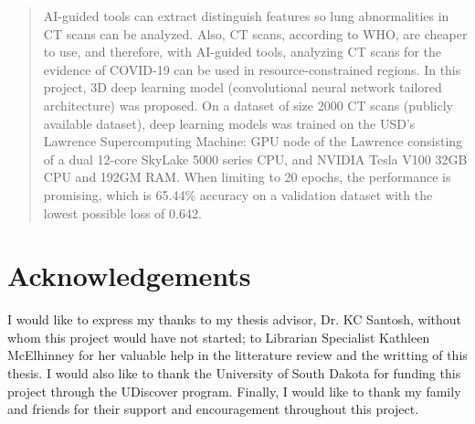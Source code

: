 \documentclass[12pt, letterpaper]{article}
\begin{document}
\newpage
\begin{abstract}
AI-guided tools can extract distinguish features so lung abnormalities in CT scans can be analyzed. Also, CT scans, according to WHO, are cheaper to use, and therefore, with AI-guided tools, analyzing CT scans for the evidence of COVID-19 can be used in resource-constrained regions. 
In this project, 3D deep learning model (convolutional neural network tailored architecture) was proposed. On a dataset of size 2000 CT scans (publicly available dataset), deep learning models was trained on the USD’s Lawrence Supercomputing Machine: GPU node of the Lawrence consisting of a dual 12-core SkyLake 5000 series CPU, and NVIDIA Tesla V100 32GB CPU and 192GM RAM. 
When limiting to 20 epochs, the performance is promising, which is 65.44\% accuracy on a validation dataset with the lowest possible loss of 0.642.


\end{abstract}

\newpage
\pagestyle{plain}
\tableofcontents

\newpage
\listoffigures

\newpage
\section{Acknowledgements}

I would like to express my thanks to my thesis advisor, Dr. KC Santosh, without whom this project would have not started; to Librarian Specialist Kathleen McElhinney for her valuable help in the litterature review and the writting of this thesis. I would also like to thank the University of South Dakota for funding this project through the UDiscover program. Finally, I would like to thank my family and friends for their support and encouragement throughout this project.


\newpage
{}
\end{document}
